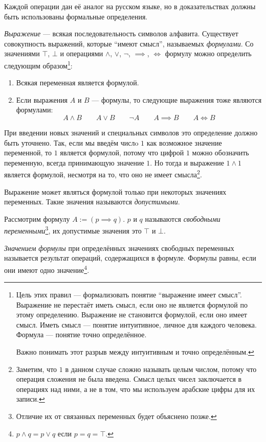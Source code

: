 Каждой операции дан её аналог на русском языке, но в доказательствах
должны быть использованы формальные определения.

{\it Выражение} --- всякая последовательность символов алфавита. Существует совокупность
выражений, которые ``имеют смысл'', называемых {\it формулами}.
Со значениями $\top$, $\bot$
и операциями $\land$, $\lor$, $\lnot$, $\implies$, $\iff$ формулу можно
определить следующим образом\footnote{
	Цель этих правил --- формализовать понятие ``выражение имеет смысл''.
	Выражение не перестаёт иметь смысл, если оно не является формулой по этому определению.
	Выражение не становится формулой, если оно имеет смысл. Иметь смысл --- понятие
	интуитивное, личное для каждого человека. Формула --- понятие точно определённое.

	Важно понимать этот разрыв между интуитивным и точно определённым.
}:
\begin{enumerate}
	\item{}Всякая переменная является формулой.
	\item{}Если выражения $A$ и $B$ --- формулы, то следующие выражения
	тоже являются формулами:
	\[
		A\land B\qquad A\lor B\qquad \lnot A\qquad A\implies B\qquad A\iff B
	\]
\end{enumerate}

При введении новых значений и специальных символов это определение
должно быть уточнено. Так, если мы введём числo $1$
как возможное значение переменной, то $1$ является формулой, потому что цифрой $1$
можно обозначить переменную, всегда принимающую значение $1$. Но тогда и
выражение $1\land 1$ является формулой, несмотря на то, что оно не имеет
смысла\footnote{
	Заметим,
	что $1$ в данном случае сложно называть целым числом, потому что операция сложения
	не была введена. Смысл целых чисел заключается в операциях над ними, а не в том, что мы
	используем арабские цифры для их записи.}.

Выражение может являться формулой только при некоторых значениях
переменных. Такие значения называются {\it допустимыми}.

Рассмотрим формулу ${A:=(p\implies q)}$. $p$ и $q$ называются {\it свободными
переменными}\footnote{Отличие их от связанных переменных будет объяснено позже.},
их допустимые значения это $\top$ и $\bot$.

	{\it Значением формулы} при определённых значениях свободных переменных называется
результат операций, содержащихся в формуле.
Формулы равны, если они имеют одно значение\footnote{$p\land q=p\lor q$ если $p=q=\top$.}.

